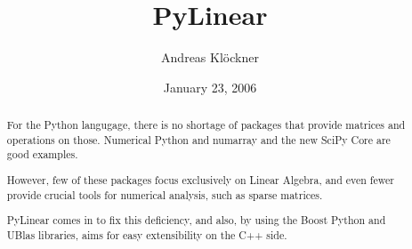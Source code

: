 \documentclass[hyperref]{manual}
\title{PyLinear}
\author{Andreas Kl\"ockner}
\date{January 23, 2006}
\begin{document}
\maketitle

\begin{abstract}
  \noindent
  For the Python langugage, there is no shortage of packages that
  provide matrices and operations on those. Numerical Python and
  numarray and the new SciPy Core are good examples.

  However, few of these packages focus exclusively on Linear Algebra,
  and even fewer provide crucial tools for numerical analysis, such as
  sparse matrices.

  PyLinear comes in to fix this deficiency, and also, by using the 
  Boost Python and UBlas libraries, aims for easy extensibility on the C++ side.
\end{abstract}

\tableofcontents









\appendix




\end{document}

